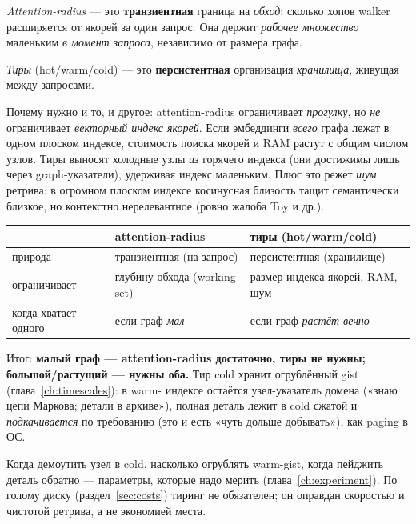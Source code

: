 \emph{Attention-radius} — это \textbf{транзиентная} граница на \emph{обход}: сколько
хопов walker расширяется от якорей за один запрос. Она держит \emph{рабочее множество}
маленьким \emph{в момент запроса}, независимо от размера графа.

\emph{Тиры} (hot/warm/cold) — это \textbf{персистентная} организация \emph{хранилища},
живущая между запросами.

Почему нужно и то, и другое: attention-radius ограничивает \emph{прогулку}, но \emph{не}
ограничивает \emph{векторный индекс якорей}. Если эмбеддинги \emph{всего} графа лежат
в одном плоском индексе, стоимость поиска якорей и RAM растут с общим числом узлов.
Тиры выносят холодные узлы \emph{из} горячего индекса (они достижимы лишь через
graph-указатели), удерживая индекс маленьким. Плюс это режет \emph{шум} ретрива: в
огромном плоском индексе косинусная близость тащит семантически близкое, но
контекстно нерелевантное (ровно жалоба Toy и др.).

\begin{center}
\begin{tabular}{p{} p{} p{}}
\toprule
 & \textbf{attention-radius} & \textbf{тиры (hot/warm/cold)} \\
\midrule
природа & транзиентная (на запрос) & персистентная (хранилище) \\
ограничивает & глубину обхода (working set) & размер индекса якорей, RAM, шум \\
когда хватает одного & если граф \emph{мал} & если граф \emph{растёт вечно} \\
\bottomrule
\end{tabular}
\end{center}

Итог: \textbf{малый граф — attention-radius достаточно, тиры не нужны; большой/растущий
— нужны оба.} Тир cold хранит огрублённый gist (глава~\ref{ch:timescales}): в warm-
индексе остаётся узел-указатель домена («знаю цепи Маркова; детали в архиве»), полная
деталь лежит в cold сжатой и \emph{подкачивается} по требованию (это и есть «чуть
дольше добывать»), как paging в ОС.

\begin{openq}
Когда демоутить узел в cold, насколько огрублять warm-gist, когда пейджить деталь
обратно — параметры, которые надо мерить (глава~\ref{ch:experiment}). По голому диску
(раздел~\ref{sec:costs}) тиринг не обязателен; он оправдан скоростью и чистотой
ретрива, а не экономией места.
\end{openq}

